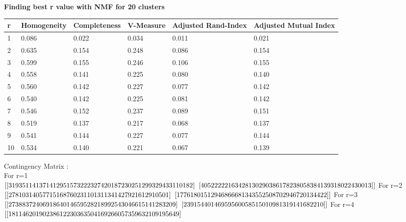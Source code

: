 \documentclass{article}
\begin{document}
\textbf{Finding best r value with NMF for 20 clusters}\\
\begin{center}
	\begin{tabular}{ | m{3cm}| m{2cm} | m{2cm} | m{2cm} | m{2cm} | m{2cm} | } 
		\hline
		r & Homogeneity& Completeness& V-Measure& Adjusted Rand-Index& Adjusted Mutual Index \\ 
		\hline
		1 & 0.086& 0.022& 0.034& 0.011& 0.021 \\ 
		\hline
		2 & 0.635& 0.154& 0.248& 0.086& 0.154 \\ 
		\hline
		3 & 0.599& 0.155& 0.246& 0.106& 0.155\\
		\hline
		4 & 0.558& 0.141& 0.225& 0.080& 0.140\\
		\hline
		5 & 0.560& 0.142& 0.227& 0.077& 0.142\\
		\hline
		6 & 0.540& 0.142& 0.225& 0.081& 0.142\\
		\hline
		7 & 0.546& 0.152& 0.237& 0.089& 0.151\\
		\hline
		8 & 0.519& 0.137& 0.217& 0.068& 0.137\\
		\hline
		9 & 0.541& 0.144& 0.227& 0.077& 0.144\\
		\hline
		10 & 0.534& 0.140& 0.221& 0.067& 0.139\\
		\hline
	\end{tabular}
\end{center}
Contingency Matrix : \\
For r=1\\
$[[319 351 141  37 141 295 157 322 232  74  20 187 230 251 299 329   4 331 101  82]\\$
$[405 222 221   6 342  81  30 290 386 178   2 380  58 384 139 318   0 224 300  13]]\\$
For r=2\\
$[[278  10 314   0 577   1 516  87  60 231 101 311 341   4  27  92 161 291 0 501]\\$
$[177 618   0 151  29 468   6 668 134 355 250   8  70 294 672   0   1  34 42   2]]\\$
For r=3\\
$[[ 273   88  372   40   69   18    6   40  146  595  282  189   92  543 0  466  151   41  283  209]\\$
$[ 239    1  544    0  146  959  560    0    5   85   15    0 1098   13 191    4   16   82   21    0]]\\$
For r=4\\
$[[181 146  20 190 238  61 223   0 363 504 169 266   0  57 359  63 210   9 195 649]\\$
\end{document}

